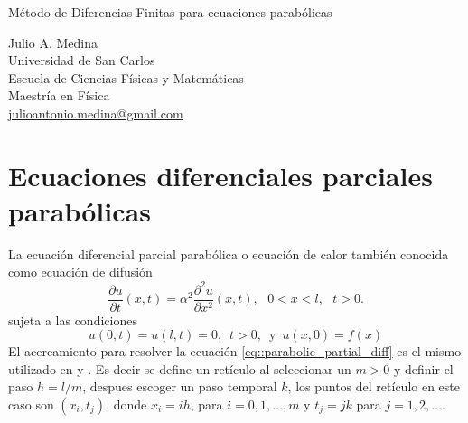 \documentclass[a4paper]{article}
\begin{document}

\Large
 \begin{center}
Método de Diferencias Finitas para ecuaciones parabólicas\\


\hspace{10pt}

\large
Julio A. Medina\\
\hspace{10pt}
\small  
Universidad de San Carlos\\
Escuela de Ciencias Físicas y Matemáticas\\
Maestría en Física\\
\href{mailto:julioantonio.medina@gmail.com}{julioantonio.medina@gmail.com}\\

\end{center}

\hspace{10pt}

\normalsize
\section{Ecuaciones diferenciales parciales parabólicas}
La ecuación diferencial parcial parabólica o ecuación de calor también conocida como ecuación de difusión
\begin{equation}\label{eq::parabolic_partial_diff}
\frac{\partial u}{\partial t}(x,t) = \alpha^2 \frac{\partial^2 u}{\partial x^2}(x,t),\,\,\,\, 0<x<l, \,\,\,\, t>0.
\end{equation}
sujeta a las condiciones
\begin{equation}
u(0,t)=u(l,t)=0,\,\,\, t>0, \,\,\,\text{y}\,\,\, u(x,0)=f(x)
\end{equation}
El acercamiento para resolver la ecuación \ref{eq::parabolic_partial_diff} es el mismo utilizado en \cite{Medina} y \cite{Burden}. Es decir se define un retículo al seleccionar un $m>0$ y definir el paso $h=l/m$, despues escoger un paso temporal $k$, los puntos del retículo en este caso son $(x_i, t_j)$, donde $x_i=ih$, para $i=0,1,\hdots,m$ y $t_j=jk$ para $j=1,2,\hdots$. 
\end{document}
